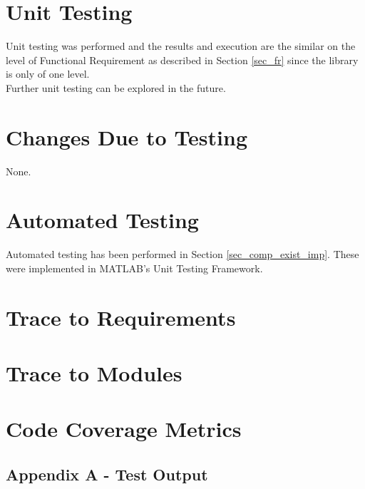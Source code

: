 \documentclass[12pt, titlepage]{article}
\begin{document}
\section{Unit Testing} \label{sec_ut}
Unit testing was performed and the results and execution are the similar
on the level of Functional Requirement as described in Section \ref{sec_fr}
since the library is only of one level.\\

Further unit testing can be explored in the future.

\section{Changes Due to Testing} \label{sec_changes}

None.

\section{Automated Testing} \label{sec_at}

Automated testing has been performed in Section \ref{sec_comp_exist_imp}.
These were implemented in MATLAB's Unit Testing Framework.
		
\section{Trace to Requirements} \label{sec_trace_req}
		
\section{Trace to Modules}	 \label{sec_trace_modules}

\section{Code Coverage Metrics} \label{sec_ccm}





\newpage
\begin{landscape}
\section{Appendix A - Test Output} \label{app_a}

\end{landscape}
\end{document}
